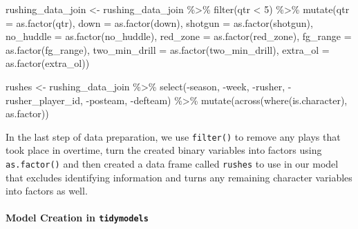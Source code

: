 \documentclass[
  letterpaper,
]{krantz}
\let\oldparagraph\paragraph
\renewcommand{\paragraph}[1]{\oldparagraph{#1}\mbox{}}
\newenvironment{Shaded}{\begin{snugshade}}{\end{snugshade}}
\newcommand{\AttributeTok}[1]{\textcolor[rgb]{0.40,0.45,0.13}{#1}}
\newcommand{\DecValTok}[1]{\textcolor[rgb]{0.68,0.00,0.00}{#1}}
\newcommand{\FunctionTok}[1]{\textcolor[rgb]{0.28,0.35,0.67}{#1}}
\newcommand{\NormalTok}[1]{\textcolor[rgb]{0.00,0.23,0.31}{#1}}
\newcommand{\OtherTok}[1]{\textcolor[rgb]{0.00,0.23,0.31}{#1}}
\newcommand{\SpecialCharTok}[1]{\textcolor[rgb]{0.37,0.37,0.37}{#1}}
\begin{document}
\begin{Shaded}
\begin{Highlighting}[]
\NormalTok{rushing\_data\_join }\OtherTok{\textless{}{-}}\NormalTok{ rushing\_data\_join }\SpecialCharTok{\%\textgreater{}\%}
  \FunctionTok{filter}\NormalTok{(qtr }\SpecialCharTok{\textless{}} \DecValTok{5}\NormalTok{) }\SpecialCharTok{\%\textgreater{}\%}
  \FunctionTok{mutate}\NormalTok{(}\AttributeTok{qtr =} \FunctionTok{as.factor}\NormalTok{(qtr),}
         \AttributeTok{down =} \FunctionTok{as.factor}\NormalTok{(down),}
         \AttributeTok{shotgun =} \FunctionTok{as.factor}\NormalTok{(shotgun),}
         \AttributeTok{no\_huddle =} \FunctionTok{as.factor}\NormalTok{(no\_huddle),}
         \AttributeTok{red\_zone =} \FunctionTok{as.factor}\NormalTok{(red\_zone),}
         \AttributeTok{fg\_range =} \FunctionTok{as.factor}\NormalTok{(fg\_range),}
         \AttributeTok{two\_min\_drill =} \FunctionTok{as.factor}\NormalTok{(two\_min\_drill),}
         \AttributeTok{extra\_ol =} \FunctionTok{as.factor}\NormalTok{(extra\_ol))}

\NormalTok{rushes }\OtherTok{\textless{}{-}}\NormalTok{ rushing\_data\_join }\SpecialCharTok{\%\textgreater{}\%}
  \FunctionTok{select}\NormalTok{(}\SpecialCharTok{{-}}\NormalTok{season, }\SpecialCharTok{{-}}\NormalTok{week, }\SpecialCharTok{{-}}\NormalTok{rusher, }\SpecialCharTok{{-}}\NormalTok{rusher\_player\_id,}
         \SpecialCharTok{{-}}\NormalTok{posteam, }\SpecialCharTok{{-}}\NormalTok{defteam) }\SpecialCharTok{\%\textgreater{}\%}
  \FunctionTok{mutate}\NormalTok{(}\FunctionTok{across}\NormalTok{(}\FunctionTok{where}\NormalTok{(is.character), as.factor))}
\end{Highlighting}
\end{Shaded}

In the last step of data preparation, we use \texttt{filter()} to remove
any plays that took place in overtime, turn the created binary variables
into factors using \texttt{as.factor()} and then created a data frame
called \texttt{rushes} to use in our model that excludes identifying
information and turns any remaining character variables into factors as
well.

\hypertarget{model-creation-in-tidymodels}{%
\paragraph{\texorpdfstring{Model Creation in
\texttt{tidymodels}}{Model Creation in tidymodels}}\label{model-creation-in-tidymodels}}
\end{document}
